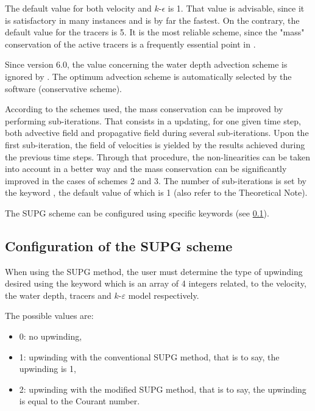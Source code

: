 The default value for both velocity and $k$-$\epsilon$ is 1. That value
is advisable, since it is satisfactory in many instances and is by far the
fastest. On the contrary, the default value for the tracers is 5. It is the
most reliable scheme, since the "mass" conservation of the active tracers is a
frequently essential point in .

Since version 6.0, the value concerning the water depth advection scheme is
ignored by . The optimum advection scheme is automatically selected
by the software (conservative scheme).

According to the schemes used, the mass conservation can be improved by
performing sub-iterations. That consists in a updating, for one given time
step, both advective field and propagative field during several sub-iterations.
Upon the first sub-iteration, the field of velocities is yielded by the results
achieved during the previous time steps. Through that procedure, the
non-linearities can be taken into account in a better way and the mass
conservation can be significantly improved in the cases of schemes 2 and 3. The
number of sub-iterations is set by the keyword , the default value of which is 1 (also refer to the
Theoretical Note).

The SUPG scheme can be configured using specific keywords (see \ref{sec:supg}).

\subsection{Configuration of the SUPG scheme}
\label{sec:supg}
When using the SUPG method, the user must determine the type of upwinding
desired using the keyword  which is an array of
4 integers related, to the velocity, the water depth, tracers and
$k$-$\varepsilon $ model respectively.

The possible values are:

\begin{itemize}
\item 0: no upwinding,

\item 1: upwinding with the conventional SUPG method, that is to say, the
upwinding is 1,

\item 2: upwinding with the modified SUPG method, that is to say, the
upwinding is equal to the Courant number.
\end{itemize}

